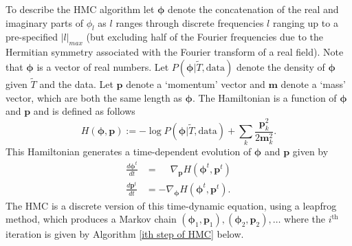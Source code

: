 \documentclass[noinfoline]{imsart}
\newcommand{\bs}{\boldsymbol}
\begin{document}
To describe the HMC algorithm let $\bs \phi$ denote the concatenation of the real and imaginary parts of $\phi_l$ as $l$ ranges through discrete frequencies $l$ ranging up to a pre-specified $|l|_{max}$ (but excluding  half of the Fourier frequencies due to the Hermitian symmetry associated with the Fourier transform of a real field). Note that $\bs \phi$ is a vector of real numbers. 
Let $P(\bs \phi|\widetilde T, \text{data})$ denote the density of $\bs \phi$ given $\widetilde T$ and the data. 
Let $\bs p$ denote a `momentum' vector and $\bs m$ denote a `mass' vector, which are both the same length as $\bs \phi$. The Hamiltonian is a function of $\bs \phi$ and $\bs p$ and is defined as follows
\[ H(\bs \phi, \bs p):= -\log P(\bs \phi|\widetilde T, \text{data})+\sum_k \frac{\bs p_k^2}{2\bs m_k^2}. \]
This Hamiltonian generates a time-dependent evolution of $\bs \phi$ and $\bs p$ given by 
\begin{align*}
\frac{d\bs \phi^t}{dt} &= \phantom{-}\nabla_{\bs p} H(\bs \phi^t, \bs p^t) \\
\frac{d\bs p^t}{dt}    &= -\nabla_{\bs \phi} H(\bs \phi^t, \bs p^t).
\end{align*} 
The HMC is a discrete version of  this time-dynamic equation, using a leapfrog method, which produces a Markov chain $(\bs \phi_1, \bs p_1), (\bs \phi_2, \bs p_2), \ldots$ where the $i^\text{th}$ iteration is given by Algorithm \ref{ith step of HMC} below.
\end{document}
